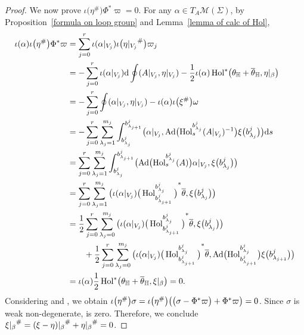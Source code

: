 \documentclass[pdftex]{sigma}
\numberwithin{equation}{section}
\theoremstyle{definition}
\newcommand{\Ad}{\operatorname{Ad}}
\newcommand{\Hol}{\operatorname{Hol}}
\newcommand{\bH}{\mathbb{H}}
\begin{document}
\begin{proof}
We now prove $\iota\bigl(\eta^{\#}\bigr)\Phi^*\varpi=0$.
 For any $\alpha \in T_A \mathcal{M}(\Sigma)$, by Proposition~\ref{formula on loop group} and Lemma~\ref{lemma of calc of Hol},
 \begin{align*}
 \iota(\alpha)\iota\bigl(\eta^{\#}\bigr) \Phi^*\varpi &= \sum_{j=0}^{r} \iota(\alpha|_{V_j}) \iota\bigl({\eta|_{V_j}}^{\#}\bigr) \varpi_j\\
 &=-\sum_{j=0}^{r} \iota(\alpha|_{V_j}) {\rm d} \oint (A|_{V_j}, \eta|_{V_j}) - \frac{1}{2} \iota(\alpha)\Hol^*\bigl(\theta_{\bH}+ \overline{\theta}_{\bH}, \eta|_{\beta}\bigr) \\
 &=-\sum_{j=0}^{r} \oint (\alpha|_{V_j}, \eta|_{V_j}) - \iota(\alpha) \iota\bigl(\xi^{\#}\bigr) \omega\\
 &= -\sum_{j=0}^{r} \sum_{\lambda_j = 1}^{m_j} \int_{b^j_{\lambda_j}}^{b^j_{\lambda_{j+1}}} \bigl(\alpha|_{V_j}, \Ad\bigl(\Hol^{b^j_{\lambda_{j}}}_{s}(A|_{V_j})^{-1}\bigr)\xi\bigl(b^j_{\lambda_j}\bigr)\bigr){\rm d} s\\
 &=\sum_{j=0}^{r} \sum_{\lambda_j =1}^{m_j} \int _{b^j_{\lambda_j}}^{b^j_{\lambda_{j+1}}} \bigl(\Ad\bigl(\Hol^{b^j_{\lambda_j}}_{s}(A)\bigr)\alpha|_{V_j}, \xi\bigl(b^j_{\lambda_j}\bigr)\bigr) \\
 &= \sum_{j=0}^{r} \sum_{\lambda_j =1}^{m_j} \big( \iota(\alpha|_{V_j}){\big(\Hol^{b^j_{\lambda_j}}_{b^j_{\lambda_{j+1}}}\big)}^*\overline{\theta}, \xi\bigl(b^j_{\lambda_j}\bigr)\big) \\
 &= \frac{1}{2} \sum_{j=0}^{r} \sum_{\lambda_j=0}^{m_j} \big( \iota(\alpha|_{V_j}){\big(\Hol^{b^j_{\lambda_j}}_{b^j_{\lambda_{j+1}}}\big)}^*\overline{\theta}, \xi\bigl(b^j_{\lambda_j}\bigr) \big)\\
 & \qquad + \frac{1}{2} \sum_{j=0}^{r} \sum_{\lambda_j=0}^{m_j} \big( \iota(\alpha|_{V_j}){\big(\Hol^{b^j_{\lambda_j}}_{b^j_{\lambda_{j+1}}}\big)}^*\overline{\theta}, \Ad\bigl(\Hol^{b^j_{\lambda_j}}_{b^j_{\lambda_{j+1}}}\bigr)\xi\bigl(b^j_{\lambda_{j+1}}\bigr) \big) \\
 &= \iota(\alpha) \frac{1}{2} \Hol^*\bigl(\theta_{\bH}+ \overline{\theta}_{\bH}, \xi|_{\beta}\bigr) =0.
 \end{align*}
 Considering  and \smash{$\eta^{\#} \in \ker\bigl(\sigma- \Phi^*\varpi\bigr)$}, we obtain $\smash{\iota\bigl(\eta^{\#}\bigr)\sigma= \iota\bigl(\eta^{\#}\bigr)}\bigl(\bigl(\sigma - \Phi^*\varpi\bigr)+\smash{\Phi^*\varpi}\bigr) =0$.
 Since $\sigma$ is weak non-degenerate, \smash{$\eta^{\#}$} is zero.
 Therefore, we conclude $\smash{{\xi|_{\beta}}^{\#} }= \smash{{(\xi-\eta)|_{\beta}}^{\#} + {\eta|_{\beta}}^{\#}}=0$.
\end{proof}
\end{document}
